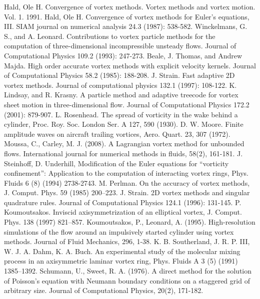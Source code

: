 \documentclass[letterpaper,12pt]{report}
\begin{document}
\begin{thebibliography}{8}
Hald, Ole H. Convergence of vortex methods. Vortex methods and vortex motion. Vol. 1. 1991.
Hald, Ole H. Convergence of vortex methods for Euler's equations, III. SIAM journal on numerical analysis 24.3 (1987): 538-582.
Winckelmans, G. S., and A. Leonard. Contributions to vortex particle methods for the computation of three-dimensional incompressible unsteady flows. Journal of Computational Physics 109.2 (1993): 247-273.
Beale, J. Thomas, and Andrew Majda. High order accurate vortex methods with explicit velocity kernels. Journal of Computational Physics 58.2 (1985): 188-208.
J. Strain. Fast adaptive 2D vortex methods. Journal of computational physics 132.1 (1997): 108-122.
K. Lindsay, and R. Krasny. A particle method and adaptive treecode for vortex sheet motion in three-dimensional flow. Journal of Computational Physics 172.2 (2001): 879-907.
L. Rosenhead. The spread of vorticity in the wake behind a cylinder, Proc. Roy. Soc. London Ser. A 127, 590 (1930).
D. W. Moore. Finite amplitude waves on aircraft trailing vortices, Aero. Quart. 23, 307 (1972).
Moussa, C., Carley, M. J. (2008). A Lagrangian vortex method for unbounded flows. International journal for numerical methods in fluids, 58(2), 161-181.
J. Steinhoff, D. Underhill, Modification of the Euler equations for ``vorticity confinement'': Application to the computation of interacting vortex rings, Phys. Fluids 6 (8) (1994) 2738-2743.
M. Perlman. On the accuracy of vortex methods, J. Comput. Phys. 59 (1985) 200–223.
J. Strain. 2D vortex methods and singular quadrature rules. Journal of Computational Physics 124.1 (1996): 131-145.
P. Koumoutsakos. Inviscid axisymmetrization of an elliptical vortex, J. Comput. Phys. 138 (1997) 821–857.
Koumoutsakos, P., Leonard, A. (1995). High-resolution simulations of the flow around an impulsively started cylinder using vortex methods. Journal of Fluid Mechanics, 296, 1-38.
K. B. Southerland, J. R. P. III, W. J. A. Dahm, K. A. Buch. An experimental study of the molecular mixing process in an axisymmetric laminar vortex ring, Phys. Fluids A 3 (5) (1991) 1385–1392.
Schumann, U., Sweet, R. A. (1976). A direct method for the solution of Poisson's equation with Neumann boundary conditions on a staggered grid of arbitrary size. Journal of Computational Physics, 20(2), 171-182.

\end{thebibliography}
\end{document}

